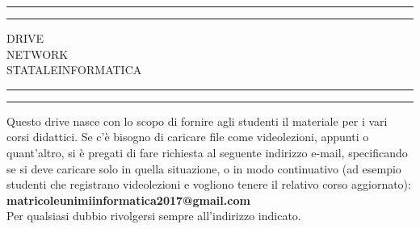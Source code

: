 \documentclass[a4paper, 11pt, oneside, article]{book} %
\begin{document}
 

\begin{titlepage} %

	\centering %
	
	\scshape %
	
	\vspace*{\baselineskip} %
	
	
	\rule{\textwidth}{1.6pt}\vspace*{-\baselineskip}\vspace*{2pt} %
	\rule{\textwidth}{0.4pt} %
	
	\vspace{0.75\baselineskip} %
	
	{\LARGE DRIVE\\ NETWORK\\ STATALEINFORMATICA\\} %
	
	\vspace{0.75\baselineskip} %
	
	\rule{\textwidth}{0.4pt}\vspace*{-\baselineskip}\vspace{3.2pt} %
	\rule{\textwidth}{1.6pt} %

	
	\vspace{2\baselineskip} %
	
	Questo drive nasce con lo scopo di fornire agli studenti il materiale per i vari corsi didattici.
	Se c’è bisogno di caricare file come videolezioni, appunti o quant’altro, si è pregati di fare richiesta al
	seguente indirizzo e-mail, specificando se si deve caricare solo in quella situazione, o in modo continuativo
	(ad esempio studenti che registrano videolezioni e vogliono tenere il relativo corso aggiornato):\\
	\textbf{matricoleunimiinformatica2017@gmail.com}\\
	Per qualsiasi dubbio rivolgersi sempre all'indirizzo indicato.



\end{titlepage}
\end{document}
